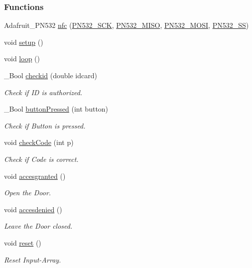 \subsubsection*{Functions}
\begin{DoxyCompactItemize}
\item 
Adafruit\+\_\+\+P\+N532 \hyperlink{TuerschlossNFC_8ino_a677e2132f2f9bbc9f391e9caa51aeee8}{nfc} (\hyperlink{TuerschlossNFC_8ino_a19c0d6db90035329695896e259b0da38}{P\+N532\+\_\+\+S\+CK}, \hyperlink{TuerschlossNFC_8ino_a7cc71e42d70cfd7298b007770c37ec60}{P\+N532\+\_\+\+M\+I\+SO}, \hyperlink{TuerschlossNFC_8ino_acaae8222f874e7ae5c75325213ccb54a}{P\+N532\+\_\+\+M\+O\+SI}, \hyperlink{TuerschlossNFC_8ino_a5fe7fdc589cffb666bd7ebf2a963ea63}{P\+N532\+\_\+\+SS})
\item 
void \hyperlink{TuerschlossNFC_8ino_a4fc01d736fe50cf5b977f755b675f11d}{setup} ()
\item 
void \hyperlink{TuerschlossNFC_8ino_afe461d27b9c48d5921c00d521181f12f}{loop} ()
\item 
\+\_\+\+Bool \hyperlink{TuerschlossNFC_8ino_aae14c356a558c5c377418831bba10961}{checkid} (double idcard)
\begin{DoxyCompactList}\small\item\em Check if ID is authorized. \end{DoxyCompactList}\item 
\+\_\+\+Bool \hyperlink{TuerschlossNFC_8ino_a5fe99fa9bcb6cd3379e5ca86647b687d}{button\+Pressed} (int button)
\begin{DoxyCompactList}\small\item\em Check if Button is pressed. \end{DoxyCompactList}\item 
void \hyperlink{TuerschlossNFC_8ino_aea979bf0d31538be11c0e2376c7e596d}{check\+Code} (int p)
\begin{DoxyCompactList}\small\item\em Check if Code is correct. \end{DoxyCompactList}\item 
void \hyperlink{TuerschlossNFC_8ino_ac09f3a433d14a38c0c7f8820894a035c}{accesgranted} ()
\begin{DoxyCompactList}\small\item\em Open the Door. \end{DoxyCompactList}\item 
void \hyperlink{TuerschlossNFC_8ino_ad16dfeef169b4b2cece036958cca6d92}{accesdenied} ()
\begin{DoxyCompactList}\small\item\em Leave the Door closed. \end{DoxyCompactList}\item 
void \hyperlink{TuerschlossNFC_8ino_ad20897c5c8bd47f5d4005989bead0e55}{reset} ()
\begin{DoxyCompactList}\small\item\em Reset Input-\/\+Array. \end{DoxyCompactList}\end{DoxyCompactItemize}
